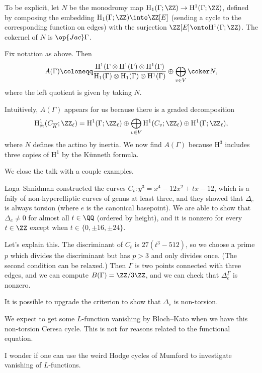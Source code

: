 \documentclass{article}
\begin{document}
To be explicit, let $N$ be the monodromy map $\mathrm H_1(\Gamma;\ZZ)\to\mathrm H^1(\Gamma;\ZZ)$, defined by composing the embedding $\mathrm H_1(\Gamma;\ZZ)\into\ZZ[E]$ (sending a cycle to the corresponding function on edges) with the surjection $\ZZ[E]\onto\mathrm H^1(\Gamma;\ZZ)$. The cokernel of $N$ is $\op{Jac}\Gamma$.
\begin{notation}
	Fix notation as above. Then
	\[A(\Gamma)\coloneqq\frac{\mathrm H^1(\Gamma\otimes\mathrm H^1(\Gamma)\otimes\mathrm H^1(\Gamma)}{\mathrm H_1(\Gamma)\otimes\mathrm H_1(\Gamma)\otimes\mathrm H^1(\Gamma)}\oplus\bigoplus_{v\in V}\coker N,\]
	where the left quotient is given by taking $N$.
\end{notation}
\begin{remark}
	Intuitively, $A(\Gamma)$ appears for us because there is a graded decomposition
	\[\mathrm H^1_{\mathrm{\acute et}}(C_{\overline K};\ZZ_\ell)=\mathrm H^1(\Gamma;\ZZ_\ell)\oplus\bigoplus_{v\in V}\mathrm H^1(C_v;\ZZ_\ell)\oplus\mathrm H^1(\Gamma;\ZZ_\ell),\]
	where $N$ defines the actino by inertia. We now find $A(\Gamma)$ because $\mathrm H^3$ includes three copies of $\mathrm H^1$ by the K\"unneth formula.
\end{remark}
We close the talk with a couple examples.
\begin{example}
	Laga--Shnidman constructed the curves $C_t\colon y^3=x^4-12x^2+tx-12$, which is a faily of non-hyperelliptic curves of genus at least three, and they showed that $\Delta_e$ is always torsion (where $e$ is the canonical basepoint). We are able to show that $\Delta_e\ne0$ for almost all $t\in\QQ$ (ordered by height), and it is nonzero for every $t\in\ZZ$ except when $t\in\{0,\pm16,\pm24\}$.

	Let's explain this. The discriminant of $C_t$ is $27\left(t^3-512\right)$, so we choose a prime $p$ which divides the discriminant but has $p>3$ and only divides once. (The second condition can be relaxed.) Then $\Gamma$ is two points connected with three edges, and we can compute $B(\Gamma)=\ZZ/3\ZZ$, and we can check that $\Delta_{\overline e}^\Gamma$ is nonzero.
\end{example}
\begin{example}
	It is possible to upgrade the criterion to show that $\Delta_e$ is non-torsion.
\end{example}
\begin{remark}
	We expect to get some $L$-function vanishing by Bloch--Kato when we have this non-torsion Ceresa cycle. This is not for reasons related to the functional equation.
\end{remark}
\begin{idea}
	I wonder if one can use the weird Hodge cycles of Mumford to investigate vanishing of $L$-functions.
\end{idea}
\end{document}
